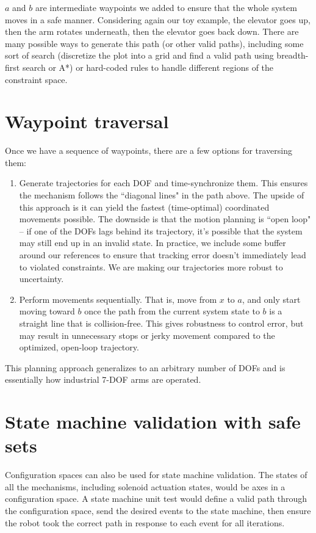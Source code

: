 $a$ and $b$ are intermediate waypoints we added to ensure that the whole system
moves in a safe manner. Considering again our toy example, the elevator goes up,
then the arm rotates underneath, then the elevator goes back down. There are
many possible ways to generate this path (or other valid paths), including some
sort of search (discretize the plot into a grid and find a valid path using
breadth-first search or A*) or hard-coded rules to handle different regions of
the constraint space.

\section{Waypoint traversal}

Once we have a sequence of waypoints, there are a few options for traversing
them:
\begin{enumerate}
  \item Generate trajectories for each DOF and time-synchronize them. This
    ensures the mechanism follows the ``diagonal lines" in the path above. The
    upside of this approach is it can yield the fastest (time-optimal)
    coordinated movements possible. The downside is that the motion planning is
    ``open loop" -- if one of the DOFs lags behind its trajectory, it's possible
    that the system may still end up in an invalid state. In practice, we
    include some buffer around our references to ensure that tracking error
    doesn’t immediately lead to violated constraints. We are making our
    trajectories more robust to uncertainty.
  \item Perform movements sequentially. That is, move from $x$ to $a$, and only
    start moving toward $b$ once the path from the current system state to $b$
    is a straight line that is collision-free. This gives robustness to control
    error, but may result in unnecessary stops or jerky movement compared to the
    optimized, open-loop trajectory.
\end{enumerate}

This planning approach generalizes to an arbitrary number of DOFs and is
essentially how industrial 7-DOF arms are operated.

\section{State machine validation with safe sets}

Configuration spaces can also be used for state machine validation. The states
of all the mechanisms, including solenoid actuation states, would be axes in a
configuration space. A state machine unit test would define a valid path through
the configuration space, send the desired events to the state machine, then
ensure the robot took the correct path in response to each event for all
iterations.
